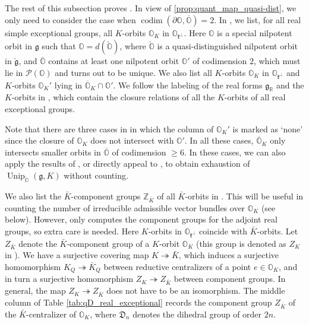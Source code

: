 \documentclass[11pt, a4paper]{amsart}
\newcommand{\g}{\mathfrak{g}}
\newcommand{\orb}{\mathbb{O}}
\newcommand{\orbk}{\orb_{K}}
\newcommand{\Z}{\mathbb{Z}}
\newcommand{\fD}{\mathfrak{D}}
\newcommand{\fg}{\mathfrak{g}}
\newcommand{\fk}{\mathfrak{k}}
\newcommand{\ckfg}{{\check{\fg}}}
\newcommand{\ckorb}{\check{\orb}}
\newcommand{\cP}{\mathcal{P}}
\DeclareMathOperator{\codim}{codim}
\DeclareMathOperator{\Unip}{Unip}
\newcommand{\UnipOv}{\Unip_{\ckorb}}
\newcommand{\R}{\mathbb{R}}
\theoremstyle{definition}
\numberwithin{equation}{section}
\begin{document}
The rest of this subsection proves . In view of \cref{prop:quant_map_quasi-dist}, we only need to consider the case when $\codim(\partial \orb, \overline{\orb}) = 2$.
In , we list, for all real simple exceptional groups, all $K$-orbits $\orbk$ in $\orb_{\fk^\perp}$. Here $\orb$ is a special nilpotent orbit in $\fg$ such that $\orb=d(\ckorb)$, where $\ckorb$ is a quasi-distinguished nilpotent orbit in $\ckfg$, and $\overline{\orb}$ contains at least one nilpotent orbit $\orb'$ of codimension $2$, which must lie in $\cP(\orb)$ and turns out to be unique. We also list all $K$-orbits $\orbk$ in $\orb_{\fk^\perp}$ and $K$-orbits $\orbk'$ lying in $\overline{\orb}_K \cap \orb'$. We follow the labeling of the real forms $\g_\R$ and the $K$-orbits in \cite{Dk1, Dk6, Dk5, Dk2, Dk3, Dk4, Dk7, Dk8}, which contain the closure relations of all the $K$-orbits of all real exceptional groups. 

Note that there are three cases in  in which the column of $\orbk'$ is marked as `none' since the closure of $\orbk$ does not intersect with $\orb'$. 
In all these cases, $\overline{\orb}_K$ only intersects smaller orbits in $\overline{\orb}$ of codimension $\geqslant 6$. In these cases, we can also apply the results of \cite{LY}, or directly appeal to \cite[Theorem 1.3.1]{LosevYu}, to obtain exhaustion of $\UnipOv(\g,K)$ without counting.

We also list the $\bar{K}$-component groups $\Z_{\bar{K}}$ of all $\bar{K}$-orbits in . This will be useful in counting the number of irreducible admissible vector bundles over $\orbk$ (see  below).
However, \cite{King} only computes the component groups for the adjoint real groups, so extra care is needed. Here $K$-orbits in $\orb_{\fk^\perp}$ coincide with $\bar{K}$-orbits. Let $Z_{\bar{K}}$ denote the $\bar{K}$-component group of a $K$-orbit $\orbk$ (this group is denoted as $Z_K$ in \cite{King}). We have a surjective covering map $K \twoheadrightarrow \bar{K}$, which induces a surjective homomorphism $K_Q \twoheadrightarrow \bar{K}_Q$ between reductive centralizers of a point $e \in \orbk$, and in turn a surjective homomorphism $Z_K \twoheadrightarrow Z_{\bar{K}}$ between component groups. In general, the map $Z_K \twoheadrightarrow Z_{\bar{K}}$ does not have to be an isomorphism. 
The middle column of Table \ref{tab:qD_real_exceptional} records the component group $Z_{\bar{K}}$ of the $\bar{K}$-centralizer of $\orbk$, where $\fD_n$ denotes the dihedral group of order $2n$. 
\end{document}
